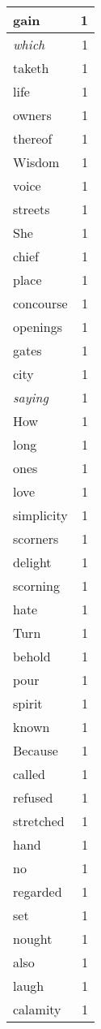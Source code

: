 \begin{center}
\begin{longtable}{l|r}
gain & 1\\ \hline 
\emph{which} & 1\\ \hline 
taketh & 1\\ \hline 
life & 1\\ \hline 
owners & 1\\ \hline 
thereof & 1\\ \hline 
Wisdom & 1\\ \hline 
voice & 1\\ \hline 
streets & 1\\ \hline 
She & 1\\ \hline 
chief & 1\\ \hline 
place & 1\\ \hline 
concourse & 1\\ \hline 
openings & 1\\ \hline 
gates & 1\\ \hline 
city & 1\\ \hline 
\emph{saying} & 1\\ \hline 
How & 1\\ \hline 
long & 1\\ \hline 
ones & 1\\ \hline 
love & 1\\ \hline 
simplicity & 1\\ \hline 
scorners & 1\\ \hline 
delight & 1\\ \hline 
scorning & 1\\ \hline 
hate & 1\\ \hline 
Turn & 1\\ \hline 
behold & 1\\ \hline 
pour & 1\\ \hline 
spirit & 1\\ \hline 
known & 1\\ \hline 
Because & 1\\ \hline 
called & 1\\ \hline 
refused & 1\\ \hline 
stretched & 1\\ \hline 
hand & 1\\ \hline 
no & 1\\ \hline 
regarded & 1\\ \hline 
set & 1\\ \hline 
nought & 1\\ \hline 
also & 1\\ \hline 
laugh & 1\\ \hline 
calamity & 1\\ \hline 

\end{longtable}
\end{center}
